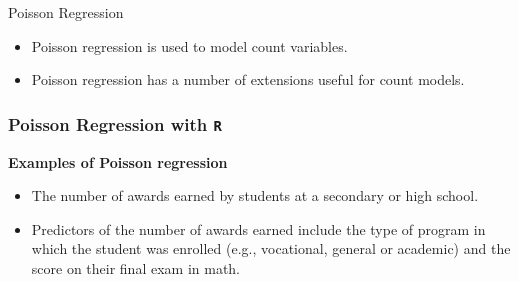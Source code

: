 \documentclass[00-GLMregslides.tex]{subfiles}
\begin{document}
%
 
\begin{frame}
	
	{\Large
		Poisson Regression
	}
	\begin{itemize}
		\item Poisson regression is used to model count variables.
		\item Poisson regression has a number of extensions useful for count models.

	\end{itemize}
\end{frame}




% 

%

\begin{frame}[fragile]

\frametitle{Poisson Regression with \texttt{R} } 
 
 \Large	
 
 \textbf{Examples of Poisson regression} \\
 	
 \begin{itemize}	
 \item The number of awards earned by students at a secondary or high school. 
 \item Predictors of the number of awards earned include the type of program in which the student was enrolled (e.g., vocational, general or academic) and the score on their final exam in math.
 \end{itemize}
 
\end{frame}
\end{document}
